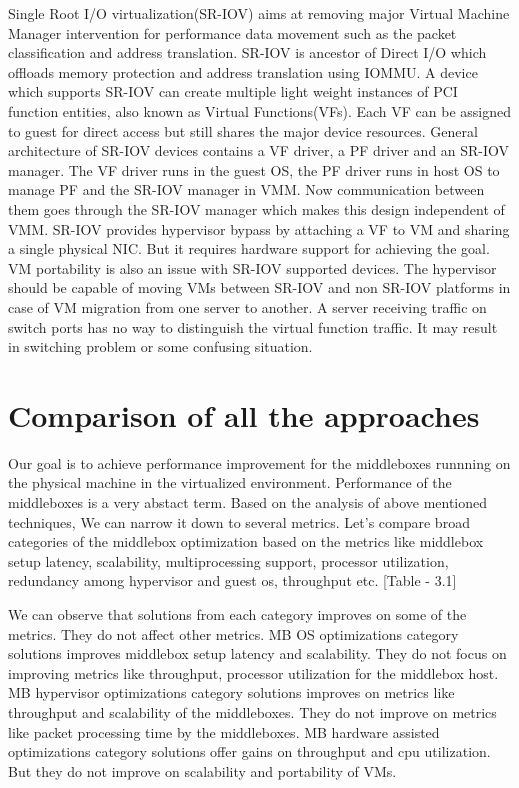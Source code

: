 \documentclass[a4paper,11pt]{report}
\begin{document}
Single Root I/O virtualization(SR-IOV)\cite{SR} aims at removing major Virtual Machine Manager intervention for performance data movement such as the packet classification and address translation. SR-IOV is ancestor of Direct I/O which offloads memory protection and address translation using IOMMU. A device which supports SR-IOV can create multiple light weight instances of PCI function entities, also known as Virtual Functions(VFs). Each VF can be assigned to guest for direct access but still shares the major device resources. General architecture of SR-IOV devices contains a VF driver, a PF driver and an SR-IOV manager. The VF driver runs in the guest OS, the PF driver runs in host OS to manage PF and the SR-IOV manager in VMM. Now communication between them goes through the SR-IOV manager which makes this design independent of VMM. SR-IOV provides hypervisor bypass by attaching a VF to VM and sharing a single physical NIC. But it requires hardware support for achieving the goal. VM portability is also an issue with SR-IOV supported devices. The hypervisor should be capable of moving VMs between SR-IOV and non SR-IOV platforms in case of VM migration from one server to another. A server receiving traffic on switch ports has no way to distinguish the virtual function traffic. It may result in switching problem or some confusing situation.\cite{SR1}\cite{SR2} 

   	                       
\section{Comparison of all the approaches}
Our goal is to achieve performance improvement for the middleboxes runnning on the physical machine in the virtualized environment. Performance of the middleboxes is a very abstact term. Based on the analysis of above mentioned techniques,  We can narrow it down to several metrics. Let's compare broad categories of the middlebox optimization based on the metrics like middlebox setup latency, scalability, multiprocessing support, processor utilization, redundancy among hypervisor and guest os, throughput etc. [Table - 3.1]        

We can observe that solutions from each category improves on some of the metrics. They do not affect other metrics. MB OS optimizations category solutions improves middlebox setup latency and scalability. They do not focus on improving metrics like throughput, processor utilization for the middlebox host. MB hypervisor optimizations category solutions improves on metrics like throughput and scalability of the middleboxes. They do not improve on metrics like packet processing time by the middleboxes. MB hardware assisted optimizations category solutions offer gains on throughput and cpu utilization. But they do not improve on scalability and portability of VMs.       
\end{document}

